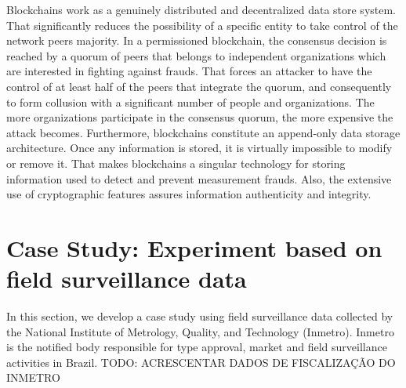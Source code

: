 \documentclass[sigplan]{acmart}
\begin{document}
Blockchains work as a genuinely distributed and decentralized data store system.
That significantly reduces the possibility of a specific entity to take control of the network peers majority.
In a permissioned blockchain, the consensus decision is reached by a quorum of peers that belongs to independent organizations which are interested in fighting against frauds.
That forces an attacker to have the control of at least half of the peers that integrate the quorum, and consequently to form collusion with a significant number of people and organizations.
The more organizations participate in the consensus quorum, the more expensive the attack becomes.
Furthermore, blockchains constitute an append-only data storage architecture.
Once any information is stored, it is virtually impossible to modify or remove it.
That makes blockchains a singular technology for storing information used to detect and prevent measurement frauds.
Also, the extensive use of cryptographic features assures information authenticity and integrity.

% 
% 
% 



\section{Case Study: Experiment based on field surveillance data}
In this section, we develop a case study using field surveillance data collected by the National Institute of Metrology, Quality, and Technology (Inmetro).
Inmetro is the notified body responsible for type approval, market and field surveillance activities in Brazil.
TODO: ACRESCENTAR DADOS DE FISCALIZAÇÃO DO INMETRO
\end{document}
